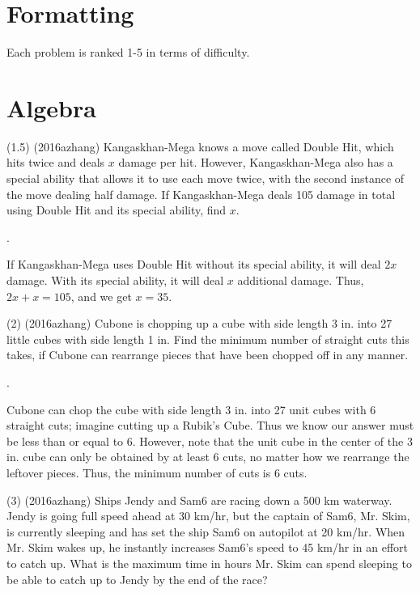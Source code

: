 \documentclass[11pt]{article}
\begin{document}
\section{Formatting}
Each problem is ranked 1-5 in terms of difficulty.

\section{Algebra}
\begin{problem}
(1.5) (2016azhang) Kangaskhan-Mega knows a move called Double Hit, which hits twice and deals $x$ damage per hit. However, Kangaskhan-Mega also has a special ability that allows it to use each move twice, with the second instance of the move dealing half damage. If Kangaskhan-Mega deals 105 damage in total using Double Hit and its special ability, find $x$.
\end{problem}

\begin{answer}
.
\end{answer}

\begin{solution}
If Kangaskhan-Mega uses Double Hit without its special ability, it will deal $2x$ damage. With its special ability, it will deal $x$ additional damage. Thus, $2x + x = 105$, and we get $x = 35$.
\end{solution}

\begin{problem}
(2) (2016azhang) Cubone is chopping up a cube with side length 3 in. into 27 little cubes with side length 1 in. Find the minimum number of straight cuts this takes, if Cubone can rearrange pieces that have been chopped off in any manner.
\end{problem}

\begin{answer}
.
\end{answer}

\begin{solution}
Cubone can chop the cube with side length 3 in. into 27 unit cubes with 6 straight cuts; imagine cutting up a Rubik's Cube. Thus we know our answer must be less than or equal to 6. However, note that the unit cube in the center of the 3 in. cube can only be obtained by at least 6 cuts, no matter how we rearrange the leftover pieces. Thus, the minimum number of cuts is 6 cuts.
\end{solution}


\begin{problem}
(3) (2016azhang) Ships Jendy and Sam6 are racing down a 500 km waterway. Jendy is going full speed ahead at 30 km/hr, but the captain of Sam6, Mr. Skim, is currently sleeping and has set the ship Sam6 on autopilot at 20 km/hr. When Mr. Skim wakes up, he instantly increases Sam6's speed to 45 km/hr in an effort to catch up. What is the maximum time in hours Mr. Skim can spend sleeping to be able to catch up to Jendy by the end of the race?
\end{problem}
\end{document}
